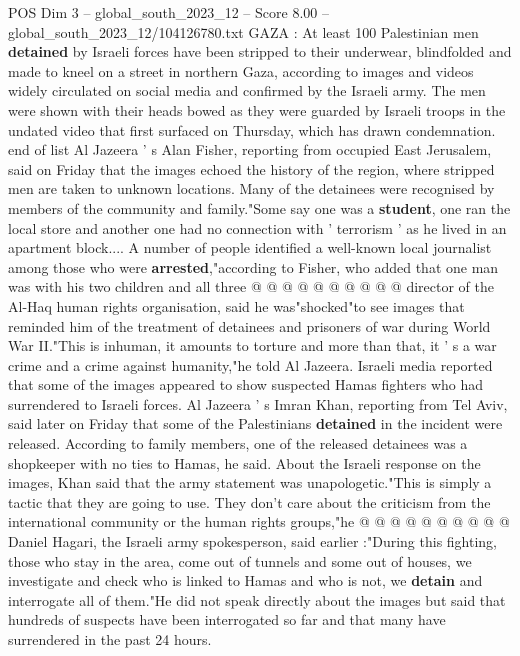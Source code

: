 \begin{textsample}{POS Dim 3 – global\_south\_2023\_12 – Score 8.00 – global\_south\_2023\_12/104126780.txt}  \label{ex:f3_pos_420}
GAZA : At least 100 Palestinian men \textbf{detained} by Israeli forces have been stripped to their underwear, blindfolded and made to kneel on a street in northern Gaza, according to images and videos widely circulated on social media and confirmed by the Israeli army.
The men were shown with their heads bowed as they were guarded by Israeli troops in the undated video that first surfaced on Thursday, which has drawn condemnation. end of list Al Jazeera ' s Alan Fisher, reporting from occupied East Jerusalem, said on Friday that the images echoed the history of the region, where stripped men are taken to unknown locations.
Many of the detainees were recognised by members of the community and family."Some say one was a \textbf{student}, one ran the local store and another one had no connection with ' terrorism ' as he lived in an apartment block....
A number of people identified a well-known local journalist among those who were \textbf{arrested},"according to Fisher, who added that one man was with his two children and all three @ @ @ @ @ @ @ @ @ @ director of the Al-Haq human rights organisation, said he was"shocked"to see images that reminded him of the treatment of detainees and prisoners of war during World War II."This is inhuman, it amounts to torture and more than that, it ' s a war crime and a crime against humanity,"he told Al Jazeera.
Israeli media reported that some of the images appeared to show suspected Hamas fighters who had surrendered to Israeli forces.
Al Jazeera ' s Imran Khan, reporting from Tel Aviv, said later on Friday that some of the Palestinians \textbf{detained} in the incident were released.
According to family members, one of the released detainees was a shopkeeper with no ties to Hamas, he said.
About the Israeli response on the images, Khan said that the army statement was unapologetic."This is simply a tactic that they are going to use.
They don't care about the criticism from the international community or the human rights groups,"he @ @ @ @ @ @ @ @ @ @ Daniel Hagari, the Israeli army spokesperson, said earlier :"During this fighting, those who stay in the area, come out of tunnels and some out of houses, we investigate and check who is linked to Hamas and who is not, we \textbf{detain} and interrogate all of them."He did not speak directly about the images but said that hundreds of suspects have been interrogated so far and that many have surrendered in the past 24 hours.

\end{textsample}
